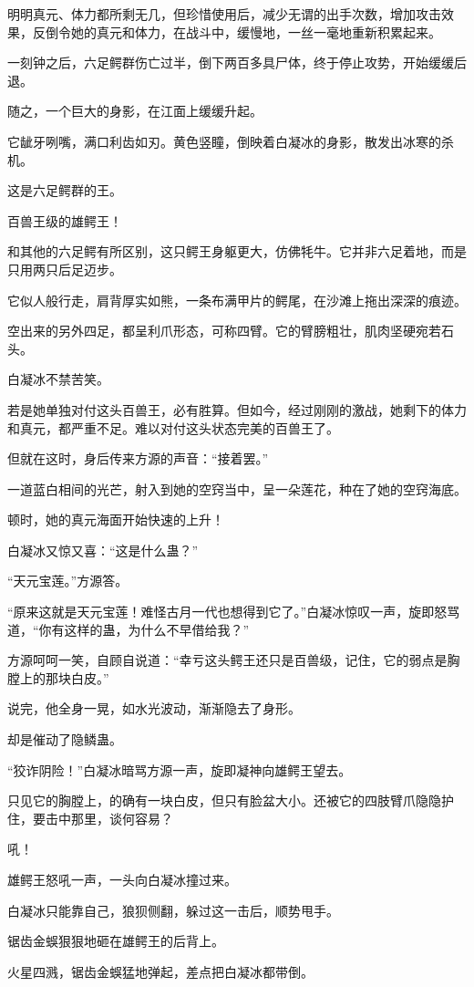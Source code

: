 \begin{this_body}
明明真元、体力都所剩无几，但珍惜使用后，减少无谓的出手次数，增加攻击效果，反倒令她的真元和体力，在战斗中，缓慢地，一丝一毫地重新积累起来。

一刻钟之后，六足鳄群伤亡过半，倒下两百多具尸体，终于停止攻势，开始缓缓后退。

随之，一个巨大的身影，在江面上缓缓升起。

它龇牙咧嘴，满口利齿如刃。黄色竖瞳，倒映着白凝冰的身影，散发出冰寒的杀机。

这是六足鳄群的王。

百兽王级的雄鳄王！

和其他的六足鳄有所区别，这只鳄王身躯更大，仿佛牦牛。它并非六足着地，而是只用两只后足迈步。

它似人般行走，肩背厚实如熊，一条布满甲片的鳄尾，在沙滩上拖出深深的痕迹。

空出来的另外四足，都呈利爪形态，可称四臂。它的臂膀粗壮，肌肉坚硬宛若石头。

白凝冰不禁苦笑。

若是她单独对付这头百兽王，必有胜算。但如今，经过刚刚的激战，她剩下的体力和真元，都严重不足。难以对付这头状态完美的百兽王了。

但就在这时，身后传来方源的声音：“接着罢。”

一道蓝白相间的光芒，射入到她的空窍当中，呈一朵莲花，种在了她的空窍海底。

顿时，她的真元海面开始快速的上升！

白凝冰又惊又喜：“这是什么蛊？”

“天元宝莲。”方源答。

“原来这就是天元宝莲！难怪古月一代也想得到它了。”白凝冰惊叹一声，旋即怒骂道，“你有这样的蛊，为什么不早借给我？”

方源呵呵一笑，自顾自说道：“幸亏这头鳄王还只是百兽级，记住，它的弱点是胸膛上的那块白皮。”

说完，他全身一晃，如水光波动，渐渐隐去了身形。

却是催动了隐鳞蛊。

“狡诈阴险！”白凝冰暗骂方源一声，旋即凝神向雄鳄王望去。

只见它的胸膛上，的确有一块白皮，但只有脸盆大小。还被它的四肢臂爪隐隐护住，要击中那里，谈何容易？

吼！

雄鳄王怒吼一声，一头向白凝冰撞过来。

白凝冰只能靠自己，狼狈侧翻，躲过这一击后，顺势甩手。

锯齿金蜈狠狠地砸在雄鳄王的后背上。

火星四溅，锯齿金蜈猛地弹起，差点把白凝冰都带倒。


\end{this_body}
